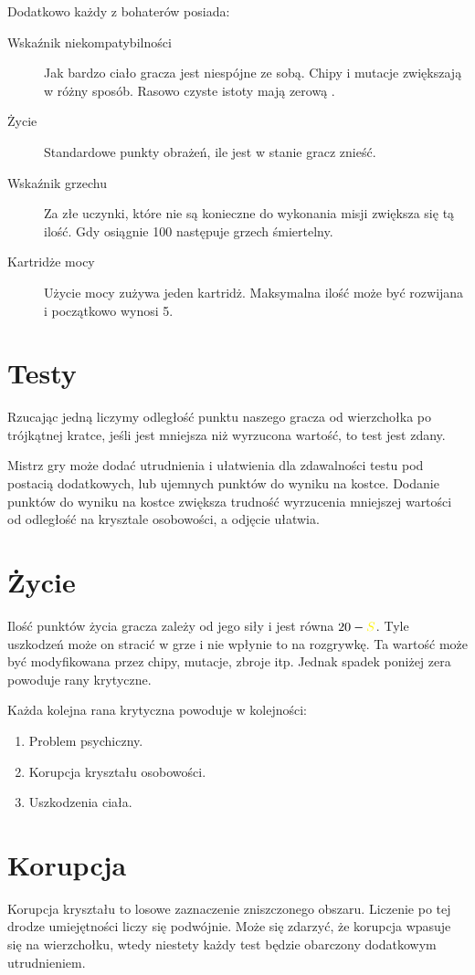 Dodatkowo każdy z bohaterów posiada:
\begin{description}
 \item [Wskaźnik niekompatybilności \abnkp{}] Jak bardzo ciało gracza jest niespójne ze sobą. Chipy i mutacje zwiększają \abnkp{} w różny sposób. Rasowo czyste istoty mają zerową \abnkp{}.
 \item [Życie \abzyc{}] Standardowe punkty obrażeń, ile jest w stanie gracz znieść.
 \item [Wskaźnik grzechu \abgrz{}] Za złe uczynki, które nie są konieczne do wykonania misji zwiększa się tą ilość. Gdy osiągnie 100 następuje grzech śmiertelny.
 \item [Kartridże mocy \abkar{}] Użycie mocy zużywa jeden kartridż. Maksymalna ilość może być rozwijana i początkowo wynosi 5.
\end{description}

\section{Testy}
Rzucając jedną \dxx{} liczymy odległość punktu naszego gracza od wierzchołka po trójkątnej kratce, jeśli jest mniejsza niż wyrzucona wartość, to test jest zdany.

Mistrz gry może dodać utrudnienia i ułatwienia dla zdawalności testu pod postacią dodatkowych, lub ujemnych punktów do wyniku na kostce.
Dodanie punktów do wyniku na kostce zwiększa trudność wyrzucenia mniejszej wartości od odległość na krysztale osobowości, a odjęcie ułatwia.

\section{Życie}
Ilość punktów życia gracza zależy od jego siły i jest równa $20 - \abs$.
Tyle uszkodzeń może on stracić w grze i nie wpłynie to na rozgrywkę.
Ta wartość może być modyfikowana przez chipy, mutacje, zbroje itp.
Jednak spadek poniżej zera powoduje rany krytyczne.

Każda kolejna rana krytyczna powoduje w kolejności:
\begin{enumerate}
\item Problem psychiczny.
\item Korupcja kryształu osobowości.
\item Uszkodzenia ciała.
\end{enumerate}

\section{Korupcja}
Korupcja kryształu to losowe zaznaczenie zniszczonego obszaru.
Liczenie po tej drodze umiejętności liczy się podwójnie.
Może się zdarzyć, że korupcja wpasuje się na wierzchołku, wtedy niestety każdy test będzie obarczony dodatkowym utrudnieniem.

